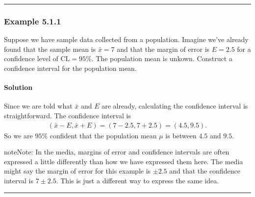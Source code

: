 \documentclass[letterpaper,10pt,english]{jupyterBook}
\begin{document}
\bigskip\hrule\bigskip



\subsubsection{Example 5.1.1}
\label{\detokenize{Ch5 Confidence Intervals/5.1 Estimating Population Means (Sigma Known):example-5-1-1}}
\sphinxAtStartPar
Suppose we have sample data collected from a population. Imagine we’ve already found that the sample mean is \(\bar{x} = 7\) and that the margin of error is \(E = 2.5\) for a confidence level of \(\text{CL} = 95\%\). The population mean is unkown. Construct a confidence interval for the population mean.


\paragraph{Solution}
\label{\detokenize{Ch5 Confidence Intervals/5.1 Estimating Population Means (Sigma Known):solution}}
\sphinxAtStartPar
Since we are told what \(\bar{x}\) and \(E\) are already, calculating the confidence interval is straightforward. The confidence interval is
\begin{equation*}
\begin{split} (\bar{x} - E, \bar{x} + E) = (7 - 2.5, 7 + 2.5) = (4.5, 9.5). \end{split}
\end{equation*}
\sphinxAtStartPar
So we are \(95\%\) confident that the population mean \(\mu\) is between \(4.5\) and \(9.5\).

\begin{sphinxadmonition}{note}{Note:}
\sphinxAtStartPar
In the media, margins of error and confidence intervals are often expressed a little differently than how we have expressed them here. The media might say the margin of error for this example is \(\pm 2.5\) and that the confidence interval is \(7 \pm 2.5\). This is just a different way to express the same idea.
\end{sphinxadmonition}


\bigskip\hrule\bigskip
\end{document}
